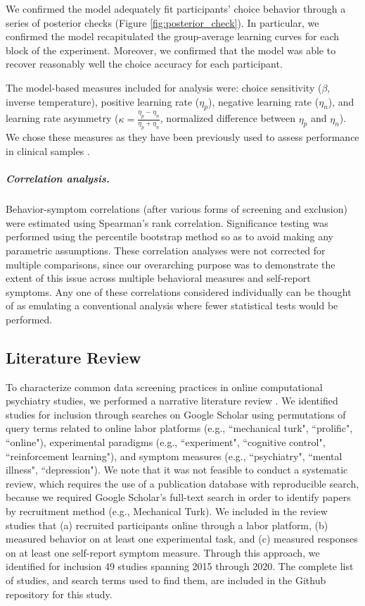 \documentclass[a4paper,notitlepage,12pt]{article}
\begin{document}
\begin{refsection}[main]
We confirmed the model adequately fit participants' choice behavior through a series of posterior checks (Figure \ref{fig:posterior_check}). In particular, we confirmed the model recapitulated the group-average learning curves for each block of the experiment. Moreover, we confirmed that the model was able to recover reasonably well the choice accuracy for each participant.

The model-based measures included for analysis were: choice sensitivity ($\beta$,  inverse temperature), positive learning rate ($\eta_p$), negative learning rate ($\eta_n$), and learning rate asymmetry ($\kappa = \frac{\eta_p-\eta_n}{\eta_p+\eta_n}$, normalized difference between $\eta_p$ and $\eta_n$). We chose these measures as they have been previously used to assess performance in clinical samples \cite{huang2017computational, brolsma2020challenging, mukherjee_reward_2020, ritschel2017neural}. 

\subparagraph{Correlation analysis.} Behavior-symptom correlations (after various forms of screening and exclusion) were estimated using Spearman's rank correlation. Significance testing was performed using the percentile bootstrap method \cite{wilcox2018guide} so as to avoid making any parametric assumptions. These correlation analyses were not corrected for multiple comparisons, since our overarching purpose was to demonstrate the extent of this issue across multiple behavioral measures and self-report symptoms. Any one of these correlations considered individually can be thought of as emulating a conventional analysis where fewer statistical tests would be performed.

\subsection*{Literature Review}

To characterize common data screening practices in online computational psychiatry studies, we performed a narrative literature review \cite{grant2009typology}. We identified studies for inclusion through searches on Google Scholar using permutations of query terms related to online labor platforms (e.g., ``mechanical turk", ``prolific", ``online"), experimental paradigms (e.g., ``experiment", ``cognitive control", ``reinforcement learning"), and symptom measures (e.g., ``psychiatry", ``mental illness", ``depression"). We note that it was not feasible to conduct a systematic review, which requires the use of a publication database with reproducible search, because we required Google Scholar's full-text search in order to identify papers by recruitment method (e.g., Mechanical Turk). We included in the review studies that (a) recruited participants online through a labor platform, (b) measured behavior on at least one experimental task, and (c) measured responses on at least one self-report symptom measure. Through this approach, we identified for inclusion 49 studies spanning 2015 through 2020. The complete list of studies, and search terms used to find them, are included in the Github repository for this study.


\end{refsection}
\end{document}
